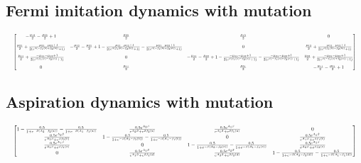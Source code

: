 \documentclass{article}
\begin{document}
\subsection*{Fermi imitation dynamics with mutation}
\begin{equation}
\resizebox{\textwidth}{!}{$
\begin{bmatrix}
-\frac{\mu_{12}}{2} - \frac{\mu_{22}}{2} + 1 &
\frac{\mu_{22}}{2} & \frac{\mu_{12}}{2} & 0\\[1em]
\frac{\mu_{21}}{2}
+ \frac{-\mu_{21} - \mu_{22} + 1}{2(e^{\beta(-f_{1}(b) + f_{2}(b))} + 1)}
&
-\frac{\mu_{12}}{2} - \frac{\mu_{21}}{2} + 1
- \frac{-\mu_{11} - \mu_{12} + 1}{2(e^{\beta(f_{1}(b) - f_{2}(b))} + 1)}
- \frac{-\mu_{21} - \mu_{22} + 1}{2(e^{\beta(-f_{1}(b) + f_{2}(b))} + 1)}
& 0 &
\frac{\mu_{12}}{2}
+ \frac{-\mu_{11} - \mu_{12} + 1}{2(e^{\beta(f_{1}(b) - f_{2}(b))} + 1)}\\[1em]
\frac{\mu_{11}}{2}
+ \frac{-\mu_{11} - \mu_{12} + 1}{2(e^{\beta(f_{1}(c) - f_{2}(c))} + 1)}
& 0 &
-\frac{\mu_{11}}{2} - \frac{\mu_{22}}{2} + 1
- \frac{-\mu_{11} - \mu_{12} + 1}{2(e^{\beta(f_{1}(c) - f_{2}(c))} + 1)}
- \frac{-\mu_{21} - \mu_{22} + 1}{2(e^{\beta(-f_{1}(c) + f_{2}(c))} + 1)}
&
\frac{\mu_{22}}{2}
+ \frac{-\mu_{21} - \mu_{22} + 1}{2(e^{\beta(-f_{1}(c) + f_{2}(c))} + 1)}\\[1em]
0 & \frac{\mu_{11}}{2} & \frac{\mu_{21}}{2} &
-\frac{\mu_{11}}{2} - \frac{\mu_{21}}{2} + 1
\end{bmatrix}$}
\label{eqn:2x2_Fermi_Mutation_Transition}
\end{equation}

\subsection*{Aspiration dynamics with mutation}
\begin{equation}
\resizebox{\textwidth}{!}{$
\left[\begin{matrix}
1 - \frac{0.5}{1 + e^{-\beta(A_{2} - f_{2}(a))}} - \frac{0.5}{1 + e^{-\beta(A_{1} - f_{1}(a))}} &
\frac{0.5 e^{A_{2}\beta}}{e^{A_{2}\beta} + e^{\beta f_{2}(a)}} &
\frac{0.5 e^{A_{1}\beta}}{e^{A_{1}\beta} + e^{\beta f_{1}(a)}} & 0\\
\frac{0.5 e^{A_{2}\beta}}{e^{A_{2}\beta} + e^{\beta f_{2}(b)}} &
1 - \frac{0.5}{1 + e^{-\beta(A_{2} - f_{2}(b))}} - \frac{0.5}{1 + e^{-\beta(A_{1} - f_{1}(b))}} &
0 &
\frac{0.5 e^{A_{1}\beta}}{e^{A_{1}\beta} + e^{\beta f_{1}(b)}}\\
\frac{0.5 e^{A_{1}\beta}}{e^{A_{1}\beta} + e^{\beta f_{1}(c)}} & 0 &
1 - \frac{0.5}{1 + e^{-\beta(A_{2} - f_{2}(c))}} - \frac{0.5}{1 + e^{-\beta(A_{1} - f_{1}(c))}} &
\frac{0.5 e^{A_{2}\beta}}{e^{A_{2}\beta} + e^{\beta f_{2}(c)}}\\
0 &
\frac{0.5 e^{A_{1}\beta}}{e^{A_{1}\beta} + e^{\beta f_{1}(d)}} &
\frac{0.5 e^{A_{2}\beta}}{e^{A_{2}\beta} + e^{\beta f_{2}(d)}} &
1 - \frac{0.5}{1 + e^{-\beta(A_{2} - f_{2}(d))}} - \frac{0.5}{1 + e^{-\beta(A_{1} - f_{1}(d))}}
\end{matrix}\right]$}
\label{eqn:2x2_Aspiration_Mutation_Transition}
\end{equation}
\end{document}
